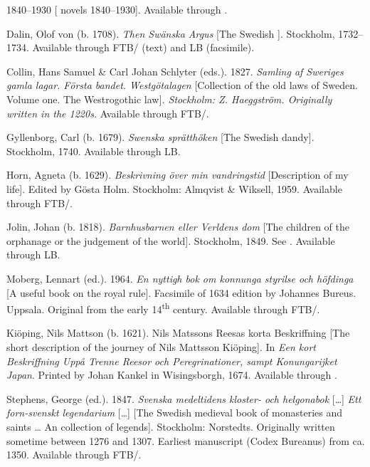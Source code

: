 \documentclass[output=paper]{langscibook}
\begin{document}
\begin{description}[font=\normalfont]\sloppy
\item[\textit{ÄSv}:]  1840–1930 [ novels 1840–1930]. Available through .
\item[\textit{Argus}:] Dalin, Olof von (b. 1708). \textit{Then Swänska Argus} [The Swedish ]. Stockholm, 1732–1734. Available through FTB\slash {} (text) and LB (facsimile).
\item[\isi{EWL}:] Collin, Hans Samuel \& Carl Johan Schlyter (eds.). 1827. \emph{Samling af Sweriges gamla lagar. Första bandet. Westgötalagen} [Collection of the old laws of Sweden. Volume one. The Westrogothic law]\emph{. \textup{Stockholm: Z. Haeggström}. \textup{Originally written in the 1220s.} }Available through FTB\slash {}.
\item[Gyllenborg:] Gyllenborg, Carl (b. 1679). \textit{Swenska sprätthöken} [The Swedish dandy]. Stockholm, 1740. Available through LB.
\item[Horn:] Horn, Agneta (b. 1629). \textit{Beskrivning över min vandringstid} [Description of my life]. Edited by Gösta Holm. Stockholm: Almqvist \& Wiksell, 1959. Available through FTB\slash {}.
\item[Jolin:] Jolin, Johan (b. 1818). \textit{Barnhusbarnen eller Verldens dom} [The children of the orphanage or the judgement of the world]. Stockholm, 1849. See \citet{MarttalaStromquist2001}. Available through LB.
\item[K-styr:] Moberg, Lennart (ed.). 1964. \textit{En nyttigh bok om konnunga styrilse och höfdinga} [A useful book on the royal rule]. Facsimile of 1634 edition by Johannes Bureus. Uppsala. Original from the early 14\textsuperscript{th} century. Available through FTB\slash {}.
\item[Kiöping:] Kiöping, Nils Mattson (b. 1621). Nils Matssons Reesas korta Beskriffning [The short description of the journey of Nils Mattsson Kiöping]. In \textit{Een kort Beskriffning Uppå Trenne Reesor och Peregrinationer, sampt Konungarijket Japan}. Printed by Johan Kankel in Wisingsborgh, 1674. Available through .
\item[Leg:] Stephens, George (ed.). 1847. \textit{Svenska medeltidens kloster- och helgonabok} […] \textit{Ett forn-svenskt legendarium} […] [The Swedish medieval book of monasteries and saints … An  collection of legends]. Stockholm: Norstedts. Originally written sometime between 1276 and 1307. Earliest manuscript (Codex Bureanus) from ca. 1350. Available through FTB\slash {}.

\end{description}
\end{document}
